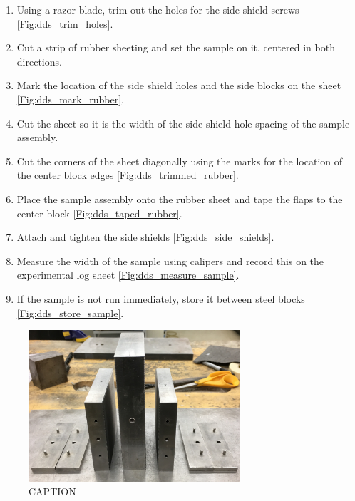 \begin{enumerate}
\item Using a razor blade, trim out the holes for the side shield screws \ref{Fig:dds_trim_holes}.
\item Cut a strip of rubber sheeting and set the sample on it, centered in both directions.
\item Mark the location of the side shield holes and the side blocks on the sheet \ref{Fig:dds_mark_rubber}.
\item Cut the sheet so it is the width of the side shield hole spacing of the sample assembly.
\item Cut the corners of the sheet diagonally using the marks for the location of the center block edges \ref{Fig:dds_trimmed_rubber}.
\item Place the sample assembly onto the rubber sheet and tape the flaps to the center block \ref{Fig:dds_taped_rubber}.
\item Attach and tighten the side shields \ref{Fig:dds_side_shields}.
\item Measure the width of the sample using calipers and record this on the experimental log sheet \ref{Fig:dds_measure_sample}.
\item If the sample is not run immediately, store it between steel blocks \ref{Fig:dds_store_sample}.
\end{enumerate}

\begin{figure}
	\centering
        \includegraphics[width=0.7\textwidth]{appendix_sample_prep/dds_clean_blocks.jpg}
   	\caption{CAPTION}
  	\label{Fig:dds_clean}
\end{figure}

